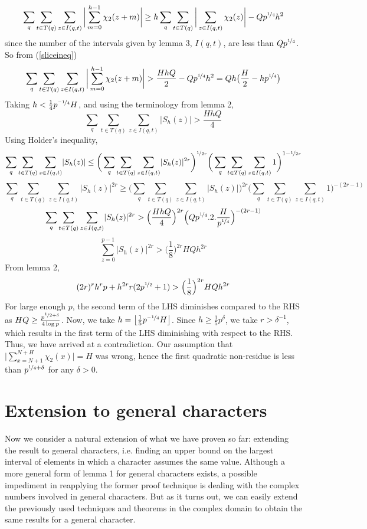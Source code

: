 \documentclass{report}
\begin{document}
$$\sum_q\sum\limits_{t\in T(q)}\sum\limits_{z\in I(q,t)}\bigg \lvert \sum\limits_{m=0}^{h-1}\chi_2(z+m) \bigg \rvert \geq h\sum_q\sum\limits_{t\in T(q)}\bigg \lvert \sum\limits_{z\in I(q,t)}\chi_2(z)\bigg \rvert-Qp^{\nicefrac{1}{4}}h^2$$
since the number of the intervals given by lemma 3, $I(q,t)$, are less than $Qp^{\nicefrac{1}{4}}$. So from (\ref{sliceineq})
$$\sum_q\sum\limits_{t\in T(q)}\sum\limits_{z\in I(q,t)}\bigg \lvert \sum\limits_{m=0}^{h-1}\chi_2(z+m) \bigg \rvert > \frac{HhQ}{2}-Qp^{\nicefrac{1}{4}} h^2=Qh\big(\frac{H}{2}-hp^{\nicefrac{1}{4}}\big)$$
Taking $h<\frac{1}{4}p^{\nicefrac{-1}{4}}H$, and using the terminology from lemma 2,
$$\sum_q\sum\limits_{t\in T(q)}\sum\limits_{z\in I(q,t)}\lvert S_h(z) \rvert > \frac{HhQ}{4}$$
Using Holder's inequality,
$$\sum_q\sum\limits_{t\in T(q)}\sum\limits_{z\in I(q,t)}\lvert S_h(z) \rvert \leq \bigg ( \sum_q\sum\limits_{t\in T(q)}\sum\limits_{z\in I(q,t)}\lvert S_h(z) \rvert^{2r} \bigg )^{\nicefrac{1}{2r}}\bigg ( \sum_q\sum\limits_{t\in T(q)}\sum\limits_{z\in I(q,t)}1 \bigg )^{1-\nicefrac{1}{2r}}$$
$$\sum_q\sum\limits_{t\in T(q)}\sum\limits_{z\in I(q,t)}\lvert S_h(z) \rvert^{2r} \geq \bigg ( \sum_q\sum\limits_{t\in T(q)}\sum\limits_{z\in I(q,t)}\lvert S_h(z) \rvert \bigg )^{2r} \bigg ( \sum_q\sum\limits_{t\in T(q)}\sum\limits_{z\in I(q,t)}1 \bigg )^{-(2r-1)}$$
$$\sum_q\sum\limits_{t\in T(q)}\sum\limits_{z\in I(q,t)}\lvert S_h(z) \rvert^{2r} > \Big( \frac{HhQ}{4}\Big)^{2r}\Big ( Qp^{\nicefrac{1}{4}}.2.\frac{H}{p^{\nicefrac{1}{4}}}\Big )^{-(2r-1)}$$
$$\sum\limits_{z=0}^{p-1}\lvert S_h(z) \rvert^{2r}>\Big(\frac{1}{8}\Big)^{2r}HQh^{2r}$$
From lemma 2,
$$(2r)^{r}h^{r}p+h^{2r}r(2p^{\nicefrac{1}{2}}+1)>\Big(\frac{1}{8}\Big)^{2r}HQh^{2r}$$
For large enough $p$, the second term of the LHS diminishes compared to the RHS as $HQ\geq \frac{p^{\nicefrac{1}{2}+\delta}}{4\log p}$. Now, we take $h=\left \lfloor \frac{1}{5}p^{\nicefrac{-1}{4}}H \right \rfloor$. Since $h \geq \frac{1}{5}p^{\delta}$, we take $r>\delta^{-1}$, which results in the first term of the LHS diminishing with respect to the RHS.
Thus, we have arrived at a contradiction. Our assumption that $\Big \lvert \sum\limits_{x=N+1}^{N+H}\chi_2(x)\Big \rvert=H$ was wrong, hence the first quadratic non-residue is less than $p^{\nicefrac{1}{4}+\delta}$ for any $\delta>0$.
%
%
\section{Extension to general characters}
%
%
Now we consider a natural extension of what we have proven so far: extending the result to general characters, i.e. finding an upper bound on the largest interval of elements in which a character assumes the same value. Although a more general form of lemma 1 for general characters exists, a possible impediment in reapplying the former proof technique is dealing with the complex numbers involved in general characters. But as it turns out, we can easily extend the previously used techniques and theorems in the complex domain to obtain the same results for a general character.
\end{document}
